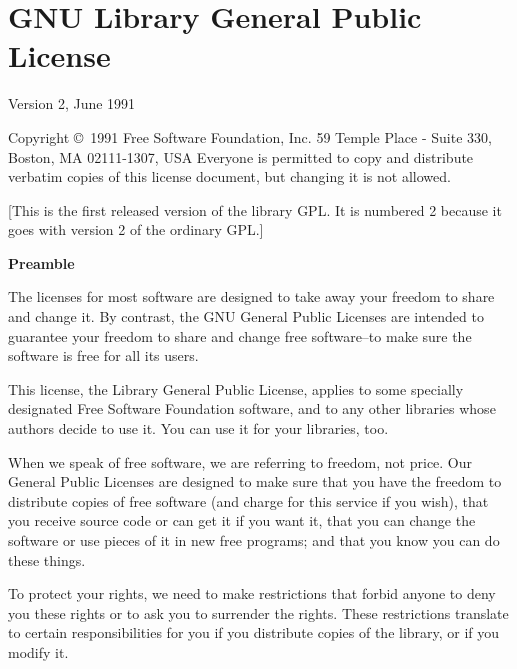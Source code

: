 
\section{GNU Library General Public License}%
%
%
%

\begin{multicols}{3}\tiny\sf%

\begin{center}
  Version 2, June 1991 
\end{center}

Copyright \copyright\ 1991 Free Software Foundation, Inc.
59 Temple Place - Suite 330, Boston, MA  02111-1307, USA
Everyone is permitted to copy and distribute verbatim copies
of this license document, but changing it is not allowed.

[This is the first released version of the library GPL.  It is
 numbered 2 because it goes with version 2 of the ordinary GPL.]

\begin{center}
\bf Preamble
\end{center}

The licenses for most software are designed to take away your freedom to
share and change it. By contrast, the GNU General Public Licenses are
intended to guarantee your freedom to share and change free software--to
make sure the software is free for all its users.

This license, the Library General Public License, applies to some specially
designated Free Software Foundation software, and to any other libraries
whose authors decide to use it. You can use it for your libraries, too.

When we speak of free software, we are referring to freedom, not price. Our
General Public Licenses are designed to make sure that you have the freedom
to distribute copies of free software (and charge for this service if you
wish), that you receive source code or can get it if you want it, that you
can change the software or use pieces of it in new free programs; and that
you know you can do these things.

To protect your rights, we need to make restrictions that forbid anyone to
deny you these rights or to ask you to surrender the rights. These
restrictions translate to certain responsibilities for you if you
distribute copies of the library, or if you modify it.


\end{multicols}

